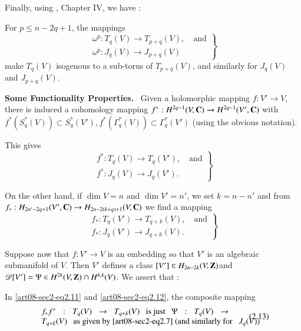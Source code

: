 Finally, using \cite{art08-key23}, Chapter IV, we have :

For $p\leq n-2q+1$, the mappings
\begin{equation*}
\left.
\begin{array}{c}
\omega^{p}:T_{q}(V)\to T_{p+q}(V),\text{~~ and}\\[4pt]
\omega^{p}: J_{q}(V)\to J_{p+q}(V)
\end{array}
\right\}\tag{2.10}\label{art08-sec2-eq2.10}
\end{equation*}
make $T_{q}(V)$ isogenous to a sub-torus of $T_{p+q}(V)$, and similarly for $J_{q}(V)$ and $J_{p+q}(V)$.

\medskip
\noindent
{\bf Some Functionality Properties.}~ Given a holomorphic mapping $f:V'\to V$, there is induced a cohomology mapping $f^{*}:H^{2q-1}(V,\mathbf{C})\to H^{2q-1}(V',\mathbf{C})$ with $f^{*}(S^{*}_{q}(V))\subset S^{*}_{q}(V'),f^{*}(\Gamma^{*}_{q}(V))\subset \Gamma^{*}_{q}(V')$ (using the obvious notation).

This gives
\begin{equation*}
\left.
\begin{array}{c}
f^{*}:T_{q}(V)\to T_{q}(V'),\text{~~ and}\\[4pt]
f^{*}:J_{q}(V)\to J_{q}(V').
\end{array}
\right\}\tag{2.11}\label{art08-sec2-eq2.11}
\end{equation*}

On the other hand, if $\dim V=n$ and $\dim V'=n'$, we set $k=n-n'$ and from $f_{*}:H_{2n'-2q+1}(V',\mathbf{C})\to H_{2n-2(k+q)+1}(V,\mathbf{C})$ we find a mapping
\begin{equation*}
\left.
\begin{array}{c}
f_{*}:T_{q}(V')\to T_{q+k}(V),\text{~~ and}\\[4pt]
f_{*}:J_{q}(V')\to J_{q+k}(V).
\end{array}
\right\}\tag{2.12}\label{art08-sec2-eq2.12}
\end{equation*}

Suppose now that $f:V'\to V$ is an embedding so that $V'$ is an algebraic submanifold of $V$. Then $V'$ defines a class $[V']\in H_{2n-2k}(V,\mathbf{Z})$\pageoriginale and $\mathscr{D}[V']=\Psi\in H^{2k}(V,\mathbf{Z})\cap H^{k,k}(V)$. We assert that :

In \eqref{art08-sec2-eq2.11} and \eqref{art08-sec2-eq2.12}, the composite mapping
\begin{equation*}
\begin{array}{p{8cm}}
$f_{*}f^{*}:T_{q}(V)\to T_{q+k}(V)\text{~~ is just~~ }\Psi:T_{q}(V)\to T_{q+k}(V)\text{~~ as given by \eqref{art08-sec2-eq2.7} (and similarly for~~ $J_{q}(V)$)}$
\end{array}\tag{2.13}\label{art08-sec2-eq2.13}
\end{equation*}

